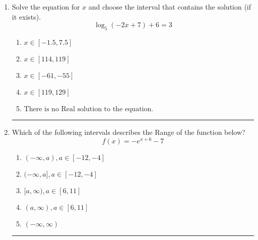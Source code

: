 \documentclass[14pt]{extbook}
\newcommand{\litem}[1]{\item#1\hspace*{-1cm}\rule{\textwidth}{0.4pt}}
\begin{document}
\begin{enumerate}
{\begin{enumerate}[label=\Alph*.]
\end{enumerate} }
\litem{
Solve the equation for $x$ and choose the interval that contains the solution (if it exists).\[ \log_{5}{(-2x+7)}+6 = 3 \]\begin{enumerate}[label=\Alph*.]
\item \( x \in [-1.5, 7.5] \)
\item \( x \in [114, 119] \)
\item \( x \in [-61, -55] \)
\item \( x \in [119, 129] \)
\item \( \text{There is no Real solution to the equation.} \)

\end{enumerate} }
\litem{
Which of the following intervals describes the Range of the function below?\[ f(x) = -e^{x+6}-7 \]\begin{enumerate}[label=\Alph*.]
\item \( (-\infty, a), a \in [-12, -4] \)
\item \( (-\infty, a], a \in [-12, -4] \)
\item \( [a, \infty), a \in [6, 11] \)
\item \( (a, \infty), a \in [6, 11] \)
\item \( (-\infty, \infty) \)

\end{enumerate} }
\end{enumerate}
\end{document}
